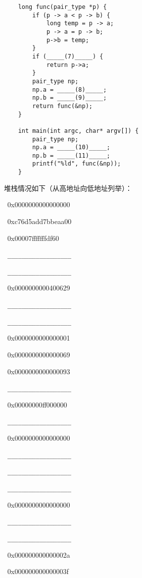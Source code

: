 \begin{problems}
\begin{verbatim}
    long func(pair_type *p) {
        if (p -> a < p -> b) {
            long temp = p -> a;
            p -> a = p -> b;
            p->b = temp;
        }
        if (_____(7)_____) {
            return p->a;
        }
        pair_type np;
        np.a = _____(8)_____;
        np.b = _____(9)_____;
        return func(&np);
    } 

    int main(int argc, char* argv[]) {
        pair_type np;
        np.a = _____(10)_____;
        np.b = _____(11)_____;
        printf("%ld", func(&np));
    }
        \end{verbatim}
        堆栈情况如下（从高地址向低地址列举）：
        {\tt \begin{compactenum}
            \item\ 0x0000000000000000
            \item\ 0xc76d5add7bbeaa00 
            \item\ 0x00007fffffffdf60 
            \item\ \verb|__________________|
            \item\ \verb|__________________|
            \item\ 0x0000000000400629 
            \item\ \verb|__________________|
            \item\ \verb|__________________|
            \item\ 0x0000000000000001 
            \item\ 0x0000000000000069 
            \item\ 0x0000000000000093 
            \item\ \verb|__________________|
            \item\ 0x00000000ff000000 
            \item\ \verb|__________________|
            \item\ 0x0000000000000000 
            \item\ \verb|__________________|
            \item\ \verb|__________________|
            \item\ \verb|__________________|
            \item\ 0x0000000000000000 
            \item\ \verb|__________________|
            \item\ \verb|__________________|
            \item\ 0x000000000000002a 
            \item\ 0x000000000000003f 

\end{compactenum}}
\end{problems}
